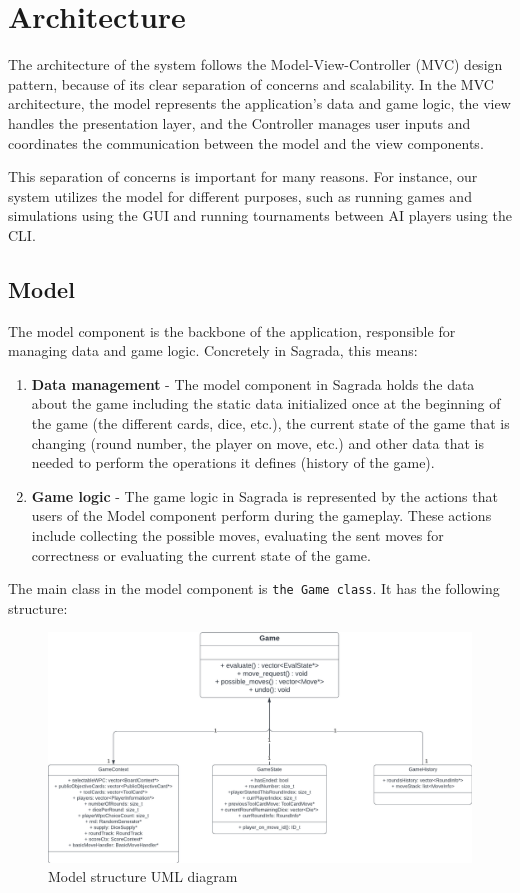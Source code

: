 \section{Architecture}
The architecture of the system follows the Model-View-Controller (MVC) design pattern, because of its clear separation 
of concerns and scalability. In the MVC architecture, the model represents the application's data and game logic, the view 
handles the presentation layer, and the Controller manages user inputs and coordinates the communication between the model and the view components. 

This separation of concerns is important for many reasons. For instance, our system utilizes the model for different purposes, such as
running games and simulations using the GUI and running tournaments between AI players using the CLI.

\subsection{Model}
The model component is the backbone of the application, responsible for managing data and game logic. Concretely in Sagrada, this means:
\begin{enumerate}
    \item \textbf{Data management} - The model component in Sagrada holds the data about the game including the static data initialized 
    once at the beginning of the game (the different cards, dice, etc.), the current state of the game that is changing (round number, the player on move, etc.)
    and other data that is needed to perform the operations it defines (history of the game).
    \item \textbf{Game logic} - The game logic in Sagrada is represented by the actions that users of the Model component
    perform during the gameplay. These actions include collecting the possible moves, evaluating the sent moves for correctness
    or evaluating the current state of the game.

\end{enumerate}

The main class in the model component is \texttt{the Game class}. It has the following structure:


\begin{figure}[H]
    \caption{ Model structure UML diagram}
    \centerline{\mbox{\includegraphics[width=166mm]{img/GameUML.pdf}}}
    \label{fig:Model_UML}
\end{figure}

